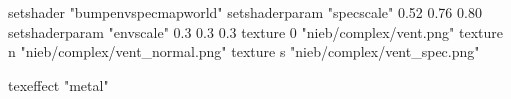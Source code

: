 setshader "bumpenvspecmapworld"
setshaderparam "specscale" 0.52 0.76 0.80
setshaderparam "envscale"  0.3 0.3 0.3
   texture 0 "nieb/complex/vent.png"
   texture n "nieb/complex/vent_normal.png"
   texture s "nieb/complex/vent_spec.png"

texeffect "metal"
